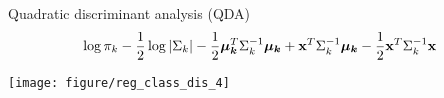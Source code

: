 \documentclass[11pt,compress,t,notes=noshow, xcolor=table]{beamer}
\begin{document}
\begin{vbframe}{Quadratic discriminant analysis (QDA)}
$$
\log \pi_{k} - \frac{1}{2} \log |\Sigma_k| - \frac{1}{2} \bm{\mu_k}^T \Sigma_k^{-1} \bm{\mu_k} + \mathbf{x}^T \Sigma_k^{-1} \bm{\mu_k} - \frac{1}{2} \mathbf{x}^T\Sigma_k^{-1}\mathbf{x} $$









\framebreak

\begin{knitrout}\scriptsize
{}\color{fgcolor}

{\centering \texttt{[image: figure/reg\_class\_dis\_4]} 

}



\end{knitrout}

\end{vbframe}
\endlecture
\end{document}
